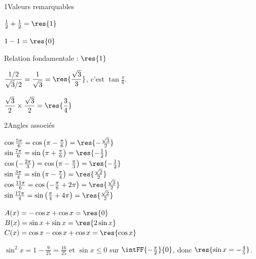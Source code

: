 

\begin{deuxcolonnes}

\begin{corrige}{1}{Valeurs remarquables}
\begin{questions}
  \item $\frac12+\frac12=\res{1}$
  \item $1-1=\res{0}$
  \item Relation fondamentale : $\res{1}$
  \item $\dfrac{1/2}{\sqrt3/2}=\dfrac{1}{\sqrt3}=\res{\dfrac{\sqrt3}{3}}$, c'est $\tan\frac{\pi}{6}$.
  \item $\dfrac{\sqrt3}{2}\times\dfrac{\sqrt3}{2}=\res{\dfrac34}$
\end{questions}
\end{corrige}

\begin{corrige}{2}{Angles associés}
\begin{questions}
  \item $\cos\frac{5\pi}{6}=\cos\left(\pi-\frac{\pi}{6}\right)=\res{-\frac{\sqrt3}{2}}$\\[0.8mm]
    $\sin\frac{7\pi}{6}=\sin\left(\pi+\frac{\pi}{6}\right)=\res{-\frac12}$\\[0.8mm]
    $\cos\left(-\frac{2\pi}{3}\right)=\cos\left(\pi-\frac{\pi}{3}\right)=\res{-\frac12}$\\[0.8mm]
    $\sin\frac{3\pi}{4}=\sin\left(\pi-\frac{\pi}{4}\right)=\res{\frac{\sqrt2}{2}}$\\[0.8mm]
    $\cos\frac{11\pi}{6}=\cos\left(-\frac{\pi}{6}+2\pi\right)=\res{\frac{\sqrt3}{2}}$\\[0.8mm]
    $\sin\frac{17\pi}{4}=\sin\left(\frac{\pi}{4}+4\pi\right)=\res{\frac{\sqrt2}{2}}$
  \item $A(x)=-\cos x+\cos x=\res{0}$\\[0.8mm]
    $B(x)=\sin x+\sin x=\res{2\sin x}$\\[0.8mm]
    $C(x)=\cos x-\cos x+\cos x=\res{\cos x}$
  \item $\sin^{2}x=1-\frac{9}{25}=\frac{16}{25}$ et $\sin x\leq0$ sur $\intFF{-\frac{\pi}{2}}{0}$, donc $\res{\sin x=-\frac45}$.
\end{questions}
\end{corrige}


\end{deuxcolonnes}
